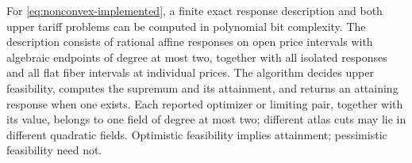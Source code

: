 \begin{theorem}
\label{thm:nonconvex-atlas}
For \eqref{eq:nonconvex-implemented}, a finite exact response description and
both upper tariff problems can be computed in polynomial bit complexity.
The description consists of rational affine responses on open price intervals
with algebraic endpoints of degree at most two, together with all isolated
responses and all flat fiber intervals at individual prices. The algorithm
decides upper feasibility, computes the supremum and its attainment, and
returns an attaining response when one exists. Each reported optimizer or limiting pair, together with its value,
belongs to one field of degree at most two; different atlas cuts may lie in
different quadratic fields. Optimistic
feasibility implies attainment; pessimistic feasibility need not.
\end{theorem}
